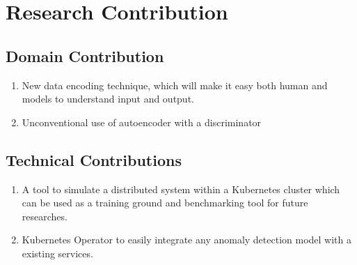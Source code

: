 \section{Research Contribution}

\subsection{Domain Contribution}
\begin{enumerate}
\item New data encoding technique, which will make it easy both human and models to understand input and output.
\item Unconventional use of autoencoder with a discriminator
\end{enumerate}

\subsection{Technical Contributions}
\begin{enumerate}
\item A tool to simulate a distributed system within a Kubernetes cluster which can be used as a training ground and benchmarking tool for future researches. 
\item Kubernetes Operator to easily integrate any anomaly detection model with a existing services.
\end{enumerate}

